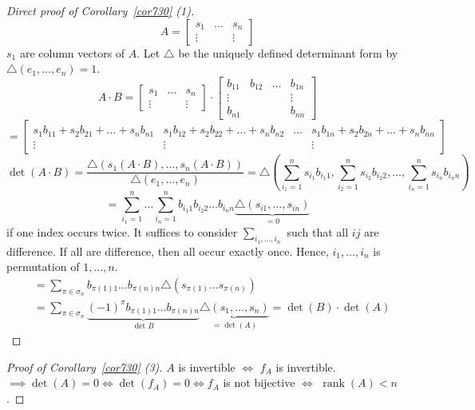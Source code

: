 \documentclass{article}
\begin{document}
\begin{proof}[Direct proof of Corollary~\ref{cor730} (1)]
  \[ A = \begin{bmatrix} s_1 & \dots & s_n \\ \vdots &  & \vdots \end{bmatrix} \]
  $s_1$ are column vectors of $A$.
  Let $\triangle$ be the uniquely defined determinant form by $\triangle(e_1, \dots, e_n) = 1$.
  \[
    A \cdot B
    = \begin{bmatrix} s_1 & \dots & s_n \\ \vdots &  & \vdots \end{bmatrix} \cdot \begin{bmatrix} b_{11} & b_{12} & \dots & b_{1n} \\ \vdots & & & \vdots \\ b_{n1} & & & b_{nn} \end{bmatrix}
  \] \[
    = \begin{bmatrix} s_1 b_{11} + s_2 b_{21} + \dots + s_n b_{n1} & s_1 b_{12} + s_2 b_{22} + \dots + s_n b_{n2} & \dots & s_1 b_{1n} + s_2 b_{2n} + \dots + s_n b_{nn} \\
    \vdots & \vdots &  & \vdots \end{bmatrix}
  \] \[
    \det(A \cdot B) = \frac{\triangle(s_1(A \cdot B), \dots, s_n(A \cdot B))}{\triangle (e_1, \dots, e_n)}
      = \triangle\left(\sum_{i_1=1}^n s_{i_1} b_{i_1 1}, \sum_{i_2=1}^n s_{i_2} b_{i_2 2}, \dots, \sum_{i_n=1}^n s_{i_n} b_{i_n n}\right)
  \] \[
    = \sum_{i_1=1}^n \dots \sum_{i_n=1}^n b_{i_1 1} b_{i_2 2} \dots b_{i_n n} \underbrace{\triangle(s_{i1}, \dots, s_{in})}_{=0}
  \]
  if one index occurs twice. It suffices to consider $\sum_{i_1,\dots,i_n}$ such that all $ij$ are difference.
  If all are difference, then all occur exactly once. Hence,
  $i_1,\dots,i_n$ is permutation of $1, \dots, n$.
  \begin{align*}
    &= \sum_{\pi \in \sigma_n} b_{\pi(1) 1} \dots b_{\pi(n) n} \triangle(s_{\pi(1)} \dots s_{\pi(n)}) \\
    &= \sum_{\pi \in \sigma_n} \underbrace{(-1)^\pi b_{\pi(1) 1} \dots b_{\pi(n) n}}_{\det{B}} \underbrace{\triangle(s_1, \dots, s_n)}_{= \det(A)} = \det(B) \cdot \det(A)
  \end{align*}
\end{proof}

\begin{proof}[Proof of Corollary~\ref{cor730} (3)]
  $A$ is invertible $\iff$ $f_A$ is invertible.
  $\implies \det(A) = 0 \iff \det(f_A) = 0 \iff f_A$ is not bijective $\iff$ $\operatorname{rank}(A) < n$.
\end{proof}
\end{document}
